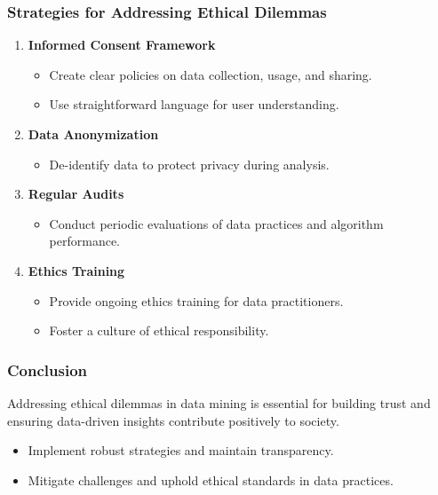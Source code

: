 \documentclass[aspectratio=169]{beamer}
\begin{document}
\begin{frame}[fragile]
    \frametitle{Strategies for Addressing Ethical Dilemmas}
    \begin{enumerate}
        \item \textbf{Informed Consent Framework}
            \begin{itemize}
                \item Create clear policies on data collection, usage, and sharing.
                \item Use straightforward language for user understanding.
            \end{itemize}
        
        \item \textbf{Data Anonymization}
            \begin{itemize}
                \item De-identify data to protect privacy during analysis.
            \end{itemize}
        
        \item \textbf{Regular Audits}
            \begin{itemize}
                \item Conduct periodic evaluations of data practices and algorithm performance.
            \end{itemize}
        
        \item \textbf{Ethics Training}
            \begin{itemize}
                \item Provide ongoing ethics training for data practitioners.
                \item Foster a culture of ethical responsibility.
            \end{itemize}
    \end{enumerate}
\end{frame}

\begin{frame}[fragile]
    \frametitle{Conclusion}
    Addressing ethical dilemmas in data mining is essential for building trust and ensuring data-driven insights contribute positively to society. 
    \begin{itemize}
        \item Implement robust strategies and maintain transparency.
        \item Mitigate challenges and uphold ethical standards in data practices.
    \end{itemize}
\end{frame}
\end{document}
